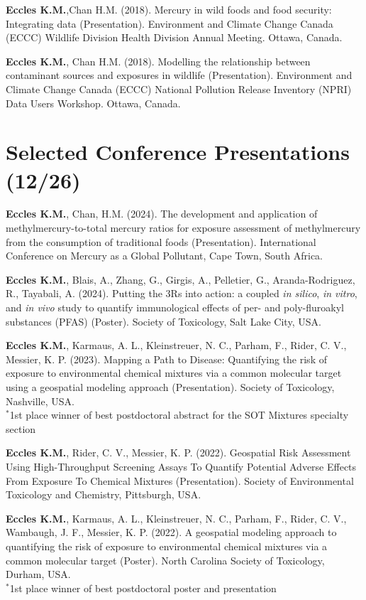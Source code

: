\documentclass[margin,line]{res}
\begin{document}
\begin{resume}
\textbf{Eccles K.M.},Chan H.M. (2018). Mercury in wild foods and food security: Integrating data (Presentation). Environment and Climate Change Canada (ECCC) Wildlife Division Health Division Annual Meeting. Ottawa, Canada.

\textbf{Eccles K.M.}, Chan H.M. (2018). Modelling the relationship between contaminant sources and exposures in wildlife (Presentation). Environment and Climate Change Canada (ECCC) National Pollution Release Inventory (NPRI) Data Users Workshop. Ottawa, Canada.

\vspace*{.1in}
\section{\sc Selected Conference Presentations (12/26)}

\textbf{Eccles K.M.}, Chan, H.M. (2024). The development and application of methylmercury-to-total mercury ratios for exposure assessment of methylmercury from the consumption of traditional foods (Presentation). International Conference on Mercury as a Global Pollutant, Cape Town, South Africa.

\textbf{Eccles K.M.}, Blais, A., Zhang, G., Girgis, A., Pelletier, G., Aranda-Rodriguez, R., Tayabali, A. (2024). Putting the 3Rs into action: a coupled \textit{in silico}, \textit{in vitro}, and \textit{in vivo} study to quantify immunological effects of per- and poly-fluroakyl substances (PFAS) (Poster). Society of Toxicology, Salt Lake City, USA.

\textbf{Eccles K.M.}, Karmaus, A. L., Kleinstreuer, N. C., Parham, F., Rider, C. V., Messier, K. P. (2023). Mapping a Path to Disease: Quantifying the risk of exposure to environmental chemical mixtures via a common molecular target using a geospatial modeling approach (Presentation). Society of Toxicology, Nashville, USA.\\
$^{*}$1st place winner of best postdoctoral abstract for the SOT Mixtures specialty section

\textbf{Eccles K.M.}, Rider, C. V., Messier, K. P. (2022). Geospatial Risk Assessment Using High-Throughput Screening Assays To Quantify Potential Adverse Effects From Exposure To Chemical Mixtures (Presentation). Society of Environmental Toxicology and Chemistry, Pittsburgh, USA.

\textbf{Eccles K.M.}, Karmaus, A. L., Kleinstreuer, N. C., Parham, F., Rider, C. V., Wambaugh, J. F., Messier, K. P. (2022). A geospatial modeling approach to quantifying the risk of exposure to environmental chemical mixtures via a common molecular target (Poster). North Carolina Society of Toxicology, Durham, USA.\\
$^{*}$1st place winner of best postdoctoral poster and presentation


\end{resume}
\end{document}
